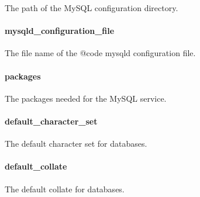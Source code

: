 
The path of the MySQL configuration directory.

\paragraph{mysqld\_configuration\_file}


The file name of the {@code mysqld} configuration file.

\paragraph{packages}


The packages needed for the MySQL service.

\paragraph{default\_character\_set}


The default character set for databases.

\paragraph{default\_collate}


The default collate for databases.
